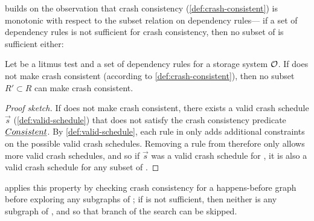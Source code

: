  builds on the observation that crash consistency (\cref{def:crash-consistent})
is monotonic with respect to the subset relation on dependency rules---%
if a set of dependency rules  is not sufficient for crash consistency,
then no subset of  is sufficient either:
%
\begin{theorem}\label{thm:synthesis:monotonicity}
Let \test be a litmus test
and  a set of dependency rules for a storage system $\mathcal{O}$.
If  does not make \test crash consistent (according to \cref{def:crash-consistent}),
then no subset $R' \subset R$ can make \test crash consistent.
\end{theorem}
\begin{proof}[Proof sketch]
If  does not make \test crash consistent,
there exists a valid crash schedule $\vec{s}$ (\cref{def:valid-schedule})
that does not satisfy the crash consistency predicate $\emph{Consistent}$.
By \cref{def:valid-schedule}, each rule in  only adds additional constraints on the possible valid crash schedules.
Removing a rule from  therefore only allows more valid crash schedules,
and so if $\vec{s}$ was a valid crash schedule for , it is also a valid crash schedule for any subset of .
\end{proof}
%
\noindent
{} applies this property by checking crash consistency
for a happens-before graph \gr before exploring any subgraphs of \gr;
if \gr is not sufficient, then neither is any subgraph of \gr,
and so that branch of the search can be skipped.


